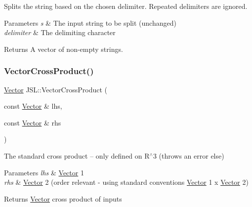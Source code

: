 Splits the string based on the chosen delimiter. Repeated delimiters are ignored. 
\begin{DoxyParams}{Parameters}
{\em s} & The input string to be split (unchanged) \\
\hline
{\em delimiter} & The delimiting character \\
\hline
\end{DoxyParams}
\begin{DoxyReturn}{Returns}
A vector of non-\/empty strings. 
\end{DoxyReturn}
\mbox{\label{namespaceJSL_aa7816eb0cd81b74241ce460237990e70}} 
\subsubsection{\texorpdfstring{Vector\+Cross\+Product()}{VectorCrossProduct()}}
{\footnotesize\ttfamily \hyperlink{classJSL_1_1Vector}{Vector} J\+S\+L\+::\+Vector\+Cross\+Product (\begin{DoxyParamCaption}\item[{const \hyperlink{classJSL_1_1Vector}{Vector} \&}]{lhs,  }\item[{const \hyperlink{classJSL_1_1Vector}{Vector} \&}]{rhs }\end{DoxyParamCaption})\hspace{0.3cm}{\ttfamily [inline]}}



The standard cross product -- only defined on R$^\wedge$3 (throws an error else) 


\begin{DoxyParams}{Parameters}
{\em lhs} & \hyperlink{classJSL_1_1Vector}{Vector} 1 \\
\hline
{\em rhs} & \hyperlink{classJSL_1_1Vector}{Vector} 2 (order relevant -\/ using standard conventions \hyperlink{classJSL_1_1Vector}{Vector} 1 x \hyperlink{classJSL_1_1Vector}{Vector} 2) \\
\hline
\end{DoxyParams}
\begin{DoxyReturn}{Returns}
\hyperlink{classJSL_1_1Vector}{Vector} cross product of inputs 
\end{DoxyReturn}
\mbox{\label{namespaceJSL_aeae64b7e0cfdc1ab5f35cca90c32d9f6}} 
